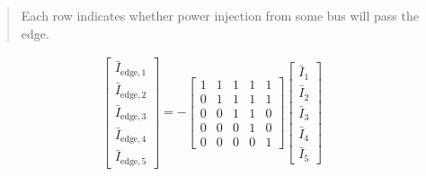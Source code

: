 \documentclass[
]{book}
\begin{document}
\begin{quote}
Each row indicates whether power injection from some bus will pass the edge.
\end{quote}

\[ \begin{aligned}
    \left[\begin{array}{l}
    \bar{I}_{\text{edge}, 1} \\
    \bar{I}_{\text{edge}, 2} \\
    \bar{I}_{\text{edge}, 3} \\
    \bar{I}_{\text{edge}, 4} \\
    \bar{I}_{\text{edge}, 5}
    \end{array}\right]
    = - \left[\begin{array}{lllll}
    1 & 1 & 1 & 1 & 1 \\
    0 & 1 & 1 & 1 & 1 \\
    0 & 0 & 1 & 1 & 0 \\
    0 & 0 & 0 & 1 & 0 \\
    0 & 0 & 0 & 0 & 1
    \end{array}\right]
    \left[\begin{array}{l}
    \bar{I}_{1} \\
    \bar{I}_{2} \\
    \bar{I}_{3} \\
    \bar{I}_{4} \\
    \bar{I}_{5}
    \end{array}\right]
\end{aligned} \]
\end{document}
